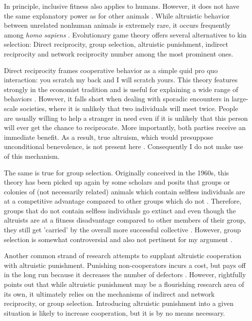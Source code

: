 \documentclass{JASSS}
\begin{document}
In principle, inclusive fitness also applies to humans. However, it does not have the same explanatory power as for other animals \citep{Abbot2013}. While altruistic behavior between unrelated nonhuman animals is extremely rare, it occurs frequently among \textit{homo sapiens} \citep{Axelrod1981,Fehr2002}. Evolutionary game theory offers several alternatives to kin selection: Direct reciprocity, group selection, altruistic punishment, indirect reciprocity and network reciprocity number among the most prominent ones.

Direct reciprocity frames cooperative behavior as a simple quid pro quo interaction: you scratch my back and I will scratch yours. This theory features strongly in the economist tradition and is useful for explaining a wide range of behaviors \citep{Axelrod1981,Fehr2002}. However, it falls short when dealing with sporadic encounters in large-scale societies, where it is unlikely that two individuals will meet twice. People are usually willing to help a stranger in need even if it is unlikely that this person will ever get the chance to reciprocate. More importantly, both parties receive an immediate benefit. As a result, true altruism, which would presuppose unconditional benevolence, is not present here \citep{Fehr2000}. Consequently I do not make use of this mechanism.

The same is true for group selection. Originally conceived in the 1960s, this theory has been picked up again by some scholars and posits that groups or colonies of (not necessarily related) animals which contain selfless individuals are at a competitive advantage compared to other groups which do not \citep{Heschl1994}. Therefore, groups that do not contain selfless individuals go extinct and even though the altruists are at a fitness disadvantage compared to other members of their group, they still get 'carried' by the overall more successful collective \citep{samir2009}. However, group selection is somewhat controversial and also not pertinent for my argument \citep{Abbot2013}.

Another common strand of research attempts to supplant altruistic cooperation with altruistic punishment. Punishing non-cooperators incurs a cost, but pays off in the long run because it decreases the number of defectors \citep{Fehr2002,boyd2003}. However, \cite{Nowak2006a} rightfully points out that while altruistic punishment may be a flourishing research area of its own, it ultimately relies on the mechanisms of indirect and network reciprocity, or group selection. Introducing altruistic punishment into a given situation is likely to increase cooperation, but it is by no means necessary.
\end{document}
